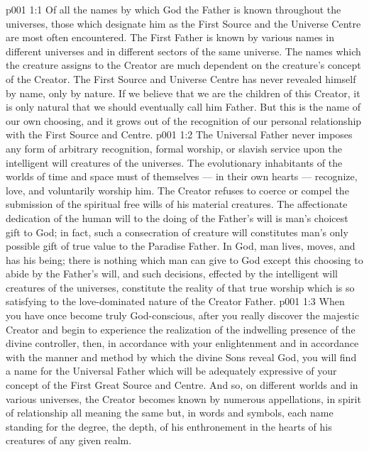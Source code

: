 \vs p001 1:1 Of all the names by which God the Father is known throughout the universes, those which designate him as the First Source and the Universe Centre are most often encountered. The First Father is known by various names in different universes and in different sectors of the same universe. The names which the creature assigns to the Creator are much dependent on the creature’s concept of the Creator. The First Source and Universe Centre has never revealed himself by name, only by nature. If we believe that we are the children of this Creator, it is only natural that we should eventually call him Father. But this is the name of our own choosing, and it grows out of the recognition of our personal relationship with the First Source and Centre.
\vs p001 1:2 The Universal Father never imposes any form of arbitrary recognition, formal worship, or slavish service upon the intelligent will creatures of the universes. The evolutionary inhabitants of the worlds of time and space must of themselves --- in their own hearts --- recognize, love, and voluntarily worship him. The Creator refuses to coerce or compel the submission of the spiritual free wills of his material creatures. The affectionate dedication of the human will to the doing of the Father’s will is man’s choicest gift to God; in fact, such a consecration of creature will constitutes man’s only possible gift of true value to the Paradise Father. In God, man lives, moves, and has his being; there is nothing which man can give to God except this choosing to abide by the Father’s will, and such decisions, effected by the intelligent will creatures of the universes, constitute the reality of that true worship which is so satisfying to the love\hyp{}dominated nature of the Creator Father.
\vs p001 1:3 When you have once become truly God\hyp{}conscious, after you really discover the majestic Creator and begin to experience the realization of the indwelling presence of the divine controller, then, in accordance with your enlightenment and in accordance with the manner and method by which the divine Sons reveal God, you will find a name for the Universal Father which will be adequately expressive of your concept of the First Great Source and Centre. And so, on different worlds and in various universes, the Creator becomes known by numerous appellations, in spirit of relationship all meaning the same but, in words and symbols, each name standing for the degree, the depth, of his enthronement in the hearts of his creatures of any given realm.
